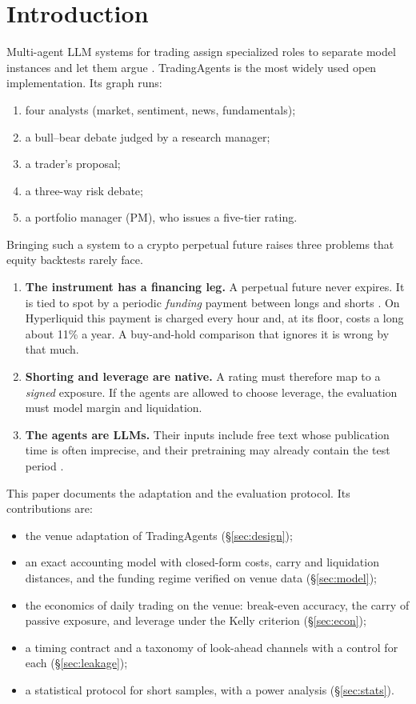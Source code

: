 \documentclass[11pt]{article}
\theoremstyle{remark}
\begin{document}
\section{Introduction}

Multi-agent LLM systems for trading assign specialized roles to separate model instances and let them argue \citep{xiao2024tradingagents,yu2023finmem,li2024cryptotrade}. TradingAgents \citep{xiao2024tradingagents} is the most widely used open implementation. Its graph runs:
\begin{enumerate}
\item four analysts (market, sentiment, news, fundamentals);
\item a bull--bear debate judged by a research manager;
\item a trader's proposal;
\item a three-way risk debate;
\item a portfolio manager (PM), who issues a five-tier rating.
\end{enumerate}

Bringing such a system to a crypto perpetual future raises three problems that equity backtests rarely face.

\begin{enumerate}
\item \textbf{The instrument has a financing leg.} A perpetual future never expires. It is tied to spot by a periodic \emph{funding} payment between longs and shorts \citep{shiller1993measuring,he2022fundamentals,ackerer2024perpetual}. On Hyperliquid this payment is charged every hour and, at its floor, costs a long about 11\% a year. A buy-and-hold comparison that ignores it is wrong by that much.
\item \textbf{Shorting and leverage are native.} A rating must therefore map to a \emph{signed} exposure. If the agents are allowed to choose leverage, the evaluation must model margin and liquidation.
\item \textbf{The agents are LLMs.} Their inputs include free text whose publication time is often imprecise, and their pretraining may already contain the test period \citep{glasserman2023assessing,sarkar2024lookahead,lopezlira2025memorization}.
\end{enumerate}

This paper documents the adaptation and the evaluation protocol. Its contributions are:
\begin{itemize}
\item the venue adaptation of TradingAgents (\S\ref{sec:design});
\item an exact accounting model with closed-form costs, carry and liquidation distances, and the funding regime verified on venue data (\S\ref{sec:model});
\item the economics of daily trading on the venue: break-even accuracy, the carry of passive exposure, and leverage under the Kelly criterion (\S\ref{sec:econ});
\item a timing contract and a taxonomy of look-ahead channels with a control for each (\S\ref{sec:leakage});
\item a statistical protocol for short samples, with a power analysis (\S\ref{sec:stats}).
\end{itemize}
\end{document}

